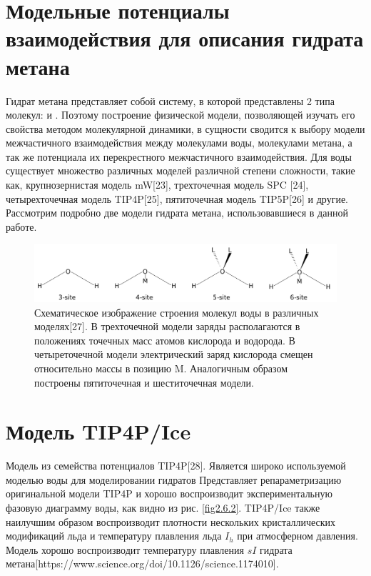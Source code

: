 \section{Модельные потенциалы взаимодействия для описания гидрата метана}
Гидрат метана представляет собой систему, в которой представлены 2 типа молекул:  и . Поэтому построение физической модели, позволяющей изучать его свойства методом молекулярной динамики, в сущности сводится к выбору модели межчастичного взаимодействия между молекулами воды, молекулами метана, а так же потенциала их перекрестного межчастичного взаимодействия. Для воды существует множество различных моделей различной степени сложности, такие как, крупнозернистая модель mW[23], трехточечная модель SPC [24], четырехточечная модель TIP4P[25], пятиточечная модель TIP5P[26] и другие. Рассмотрим подробно две модели гидрата метана, использовавшиеся в данной работе. 
\begin{figure}[H]
    \centering
    \includegraphics[width=.9\linewidth]{figures/watermodels.png}
    \caption{Схематическое изображение строения молекул воды в различных моделях[27]. В трехточечной модели заряды располагаются в положениях точечных масс атомов кислорода и водорода. В четыреточечной модели электрический заряд кислорода смещен относительно массы в позицию M. Аналогичным образом построены пятиточечная и шеститочечная модели.}
    \label{fig2.6.1}
\end{figure}

\section{Модель TIP4P/Ice}
Модель из семейства потенциалов TIP4P[28]. Является широко используемой моделью воды для моделировании гидратов Представляет репараметризацию оригинальной модели TIP4P и хорошо воспроизводит экспериментальную фазовую диаграмму воды, как видно из рис. \ref{fig2.6.2}. TIP4P/Ice также наилучшим образом воспроизводит плотности нескольких кристаллических модификаций льда и температуру плавления льда $I_h$ при атмосферном давления. Модель хорошо воспроизводит температуру плавления $sI$ гидрата метана[https://www.science.org/doi/10.1126/science.1174010].

